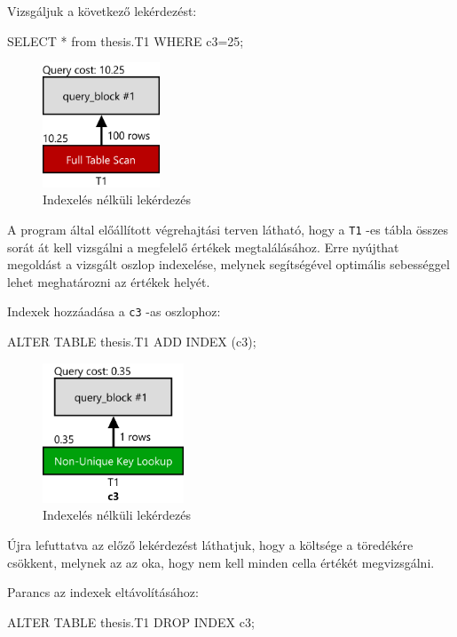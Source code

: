Vizsgáljuk a következő lekérdezést:
\begin{python}
SELECT * from thesis.T1 WHERE c3=25; 
\end{python}
\begin{figure}[h!]
\centering
\includegraphics[width=3.5cm]{images/explain/1-1.png}
\caption{Indexelés nélküli lekérdezés}
\label{fig:schema}
\end{figure}

A program által előállított végrehajtási terven látható, hogy a \texttt{T1} -es tábla összes sorát át kell vizsgálni a megfelelő értékek megtalálásához. Erre nyújthat megoldást a vizsgált oszlop indexelése, melynek segítségével optimális sebességgel lehet meghatározni az értékek helyét.

Indexek hozzáadása a \texttt{c3} -as oszlophoz:
\begin{python} 
ALTER TABLE  thesis.T1  ADD INDEX (c3);
\end{python}

\begin{figure}[h!]
\centering
\includegraphics[width=4.2cm]{images/explain/1-2.png}
\caption{Indexelés nélküli lekérdezés}
\label{fig:schema}
\end{figure}
Újra lefuttatva az előző lekérdezést láthatjuk, hogy a költsége a töredékére csökkent, melynek az az oka, hogy nem kell minden cella értékét megvizsgálni.


Parancs az indexek eltávolításához:
\begin{python} 
ALTER TABLE  thesis.T1  DROP INDEX c3;
\end{python}

\newpage
{}

